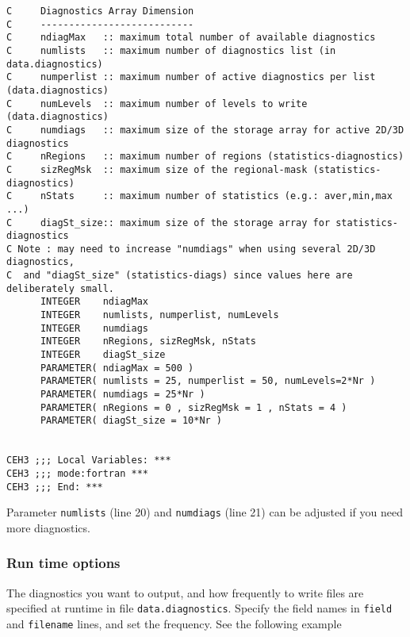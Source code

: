 \documentclass[11pt]{article}
\begin{document}
\begin{lstlisting}[caption={Example \texttt{DIAGNOSTICS\symbol{95}SIZE.h} file}, captionpos=b]
C     Diagnostics Array Dimension
C     ---------------------------
C     ndiagMax   :: maximum total number of available diagnostics
C     numlists   :: maximum number of diagnostics list (in data.diagnostics)
C     numperlist :: maximum number of active diagnostics per list (data.diagnostics)
C     numLevels  :: maximum number of levels to write    (data.diagnostics)
C     numdiags   :: maximum size of the storage array for active 2D/3D diagnostics
C     nRegions   :: maximum number of regions (statistics-diagnostics)
C     sizRegMsk  :: maximum size of the regional-mask (statistics-diagnostics)
C     nStats     :: maximum number of statistics (e.g.: aver,min,max ...)
C     diagSt_size:: maximum size of the storage array for statistics-diagnostics
C Note : may need to increase "numdiags" when using several 2D/3D diagnostics,
C  and "diagSt_size" (statistics-diags) since values here are deliberately small.
      INTEGER    ndiagMax
      INTEGER    numlists, numperlist, numLevels
      INTEGER    numdiags
      INTEGER    nRegions, sizRegMsk, nStats
      INTEGER    diagSt_size
      PARAMETER( ndiagMax = 500 )
      PARAMETER( numlists = 25, numperlist = 50, numLevels=2*Nr )
      PARAMETER( numdiags = 25*Nr )
      PARAMETER( nRegions = 0 , sizRegMsk = 1 , nStats = 4 )
      PARAMETER( diagSt_size = 10*Nr )


CEH3 ;;; Local Variables: ***
CEH3 ;;; mode:fortran ***
CEH3 ;;; End: ***
\end{lstlisting}

Parameter \verb|numlists| (line 20) and \verb|numdiags| (line 21) can be adjusted if you need more diagnostics.

\subsubsection*{Run time options}
The diagnostics you want to output, and how frequently to write files are specified at runtime in file \verb|data.diagnostics|. Specify the field names in \verb|field| and \verb|filename| lines, and set the frequency. See the following example
\end{document}
